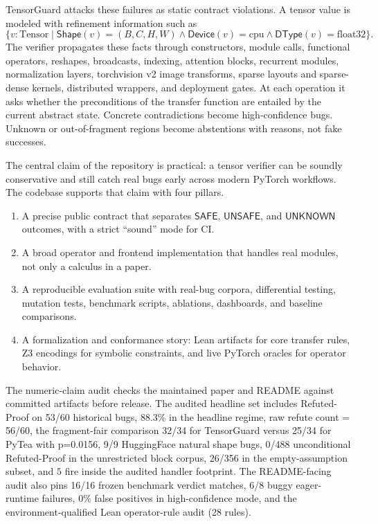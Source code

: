 \documentclass[11pt]{article}
\newcommand{\tg}{TensorGuard}
\newcommand{\shape}{\ensuremath{\mathsf{Shape}}}
\newcommand{\device}{\ensuremath{\mathsf{Device}}}
\newcommand{\dtype}{\ensuremath{\mathsf{DType}}}
\newcommand{\unknown}{\ensuremath{\mathsf{UNKNOWN}}}
\newcommand{\safe}{\ensuremath{\mathsf{SAFE}}}
\newcommand{\unsafe}{\ensuremath{\mathsf{UNSAFE}}}
\begin{document}
\tg{} attacks these failures as static contract violations.  A tensor value is
modeled with refinement information such as
\[
  \{v : \mathrm{Tensor} \mid \shape(v)=(B,C,H,W)
       \wedge \device(v)=\mathrm{cpu}
       \wedge \dtype(v)=\mathrm{float32}\}.
\]
The verifier propagates these facts through constructors, module calls,
functional operators, reshapes, broadcasts, indexing, attention blocks,
recurrent modules, normalization layers, torchvision v2 image transforms,
sparse layouts and sparse-dense kernels, distributed wrappers, and deployment
gates.  At each operation it asks whether the preconditions of the transfer
function are entailed by the current abstract state.  Concrete contradictions
become high-confidence bugs.  Unknown or out-of-fragment regions become
abstentions with reasons, not fake successes.

The central claim of the repository is practical: a tensor verifier can be
soundly conservative and still catch real bugs early across modern PyTorch
workflows.  The codebase supports that claim with four pillars.

\begin{enumerate}
\item A precise public contract that separates \safe{}, \unsafe{}, and
\unknown{} outcomes, with a strict ``sound'' mode for CI.
\item A broad operator and frontend implementation that handles real modules,
not only a calculus in a paper.
\item A reproducible evaluation suite with real-bug corpora, differential
testing, mutation tests, benchmark scripts, ablations, dashboards, and baseline
comparisons.
\item A formalization and conformance story: Lean artifacts for core transfer
rules, Z3 encodings for symbolic constraints, and live PyTorch oracles for
operator behavior.
\end{enumerate}

The numeric-claim audit checks the maintained paper and README against committed
artifacts before release.  The audited headline set includes Refuted-Proof on
53/60 historical bugs, 88.3\% in the headline regime, raw refute count = 56/60,
the fragment-fair comparison 32/34 for TensorGuard versus 25/34 for PyTea with
p=0.0156, 9/9 HuggingFace natural shape bugs, 0/488 unconditional Refuted-Proof
in the unrestricted block corpus, 26/356 in the empty-assumption subset, and $5$ fire inside the audited handler footprint.  The README-facing audit also pins
16/16 frozen benchmark verdict matches, 6/8 buggy eager-runtime failures, 0\%
false positives in high-confidence mode, and the environment-qualified Lean
operator-rule audit (28 rules).
\end{document}

